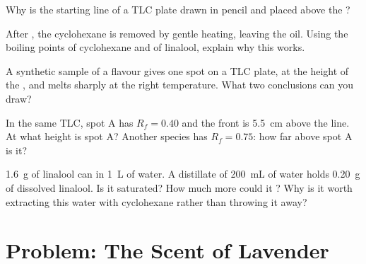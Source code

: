 \begin{exercise}[$\star\star$]\label{exo:g10:chemical-species:11}
Why is the starting line of a TLC plate drawn in pencil and placed above
the ?
\end{exercise}

\begin{exercise}[$\star\star\star$]\label{exo:g10:chemical-species:12}
After , the cyclohexane is removed by gentle heating, leaving
the oil. Using the boiling points of cyclohexane and of linalool, explain
why this works.
\end{exercise}

\begin{exercise}[$\star\star\star$]\label{exo:g10:chemical-species:13}
A synthetic sample of a flavour gives one spot on a TLC plate, at the
height of the , and melts sharply at the right
temperature. What two conclusions can you draw?
\end{exercise}

\begin{exercise}[$\star\star\star$]\label{exo:g10:chemical-species:14}
In the same TLC, spot A has $R_f = 0.40$ and the front is \qty{5.5}{cm}
above the line. At what height is spot A? Another species has
$R_f = 0.75$: how far above spot A is it?
\end{exercise}

\begin{exercise}[$\star\star\star$]\label{exo:g10:chemical-species:15}
\qty{1.6}{g} of linalool can  in \qty{1}{L} of water. A distillate
of \qty{200}{mL} of water holds \qty{0.20}{g} of dissolved linalool. Is it
saturated? How much more could it ? Why is it worth extracting
this water with cyclohexane rather than throwing it away?
\end{exercise}

\clearpage %
\section{Problem: The Scent of Lavender}

